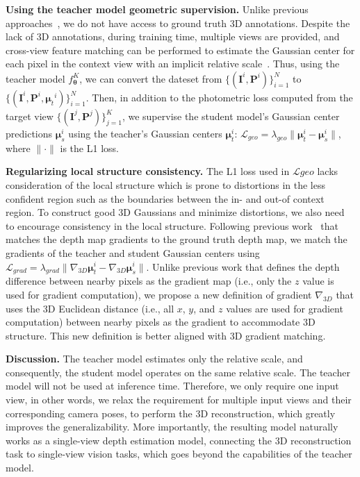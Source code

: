 \documentclass{article} %
\begin{document}
\textbf{Using the teacher model geometric supervision.} Unlike previous approaches~\citep{nichol2022point,piccinelli2024unidepth}, we do not have access to ground truth 3D annotations. Despite the lack of 3D annotations, during training time, multiple views are provided, and cross-view feature matching can be performed to estimate the Gaussian center for each pixel in the context view with an implicit relative scale~\citep{charatan2024pixelsplat}. Thus, using the teacher model $f^{K}_{\bm \theta}$, we can convert the dateset from $\{ ({\bm I}^{i}, {\bm P}^i) \}_{i=1}^N$ to $\{ ({\bm I}^{i}, {\bm P}^i, {\bm{\mu}_t}^i) \}_{i=1}^N$. Then, in addition to the photometric loss computed from the target view $\{ ({\bm I}^{j}, {\bm P}^j) \}_{j=1}^K$, we supervise the student model's Gaussian center predictions $\bm{\mu}_s^i$ using the teacher's Gaussian centers $ \bm{\mu}_t^i$: $\mathcal{L}_{geo}=\lambda_{geo}\|\bm{\mu}_t^i-\bm{\mu}_s^i\|$, where $\|\cdot\|$ is the L1 loss.

\textbf{Regularizing local structure consistency.} The L1 loss used in $\mathcal{L}{geo}$ lacks consideration of the local structure which is prone to distortions in the less confident region such as the boundaries between the in- and out-of context region. To construct good 3D Gaussians and minimize distortions, we also need to encourage consistency in the local structure. Following previous work~\citep{li2018megadepth} that matches the depth map gradients to the ground truth depth map, we match the gradients of the teacher and student Gaussian centers using $\mathcal{L}_{grad}=\lambda_{grad}\|\nabla_{3D}\bm{\mu}_t^i-\nabla_{3D}\bm{\mu}_s^i\|$. Unlike previous work \citep{li2018megadepth} that defines the depth difference between nearby pixels as the gradient map (i.e., only the $z$ value is used for gradient computation), we propose a new definition of gradient $\nabla_{3D}$ that uses the 3D Euclidean distance (i.e., all $x$, $y$, and $z$ values are used for gradient computation) between nearby pixels as the gradient to accommodate 3D structure. This new definition is better aligned with 3D gradient matching.

\textbf{Discussion.}
The teacher model estimates only the relative scale, and consequently, the student model operates on the same relative scale. The teacher model will not be used at inference time. Therefore, we only require one input view, in other words, we relax the requirement for multiple input views and their corresponding camera poses, to perform the 3D reconstruction, which greatly improves the generalizability. More importantly, the resulting model naturally works as a single-view depth estimation model, connecting the 3D reconstruction task to single-view vision tasks, which goes beyond the capabilities of the teacher model.
\end{document}
